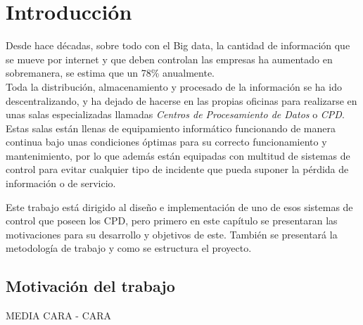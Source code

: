 \chapter{Introducción} 
\label{ch:introduccion}
Desde hace décadas, sobre todo con el Big data, la cantidad de información que se mueve por internet y que deben controlan las empresas ha aumentado en sobremanera, se estima que un 78\% anualmente\cite{monleon-getino_impacto_2015}. \\ Toda la distribución, almacenamiento y procesado de la información se ha ido descentralizando, y ha dejado de hacerse en las propias oficinas para realizarse en unas salas especializadas llamadas \textit{Centros de Procesamiento de Datos} o \textit{CPD}. \\ Estas salas están llenas de equipamiento informático funcionando de manera continua bajo unas condiciones óptimas para su correcto funcionamiento y mantenimiento, por lo que además están equipadas con multitud de sistemas de control para evitar cualquier tipo de incidente que pueda suponer la pérdida de información o de servicio.

Este trabajo está dirigido al diseño e implementación de uno de esos sistemas de control que poseen los CPD, pero primero en este capítulo se presentaran las motivaciones para su desarrollo y objetivos de este. También se presentará la metodología de trabajo y como se estructura el proyecto.

\section{Motivación del trabajo}
MEDIA CARA - CARA

